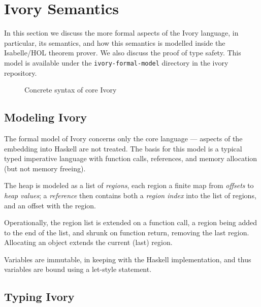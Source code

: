 \section{Ivory Semantics}
\label{sec:semantics}

In this section we discuss the more formal aspects of the Ivory
language, in particular, its semantics, and how this semantics is
modelled inside the Isabelle/HOL theorem prover.  We also
discuss the proof of type safety.  This model is available under the
\texttt{ivory-formal-model} directory in the ivory repository.

\begin{figure}[t]


\label{fig:syntax}
\caption{Concrete syntax of core Ivory }
\end{figure}


\subsection{Modeling Ivory}

The formal model of Ivory concerns only the core language --- aspects
of the embedding into Haskell are not treated.  The basis for this
model is a typical typed imperative language with function calls,
references, and memory allocation (but not memory freeing).  

The heap is modeled as a list of \emph{regions}, each region a finite
map from \emph{offsets} to \emph{heap values}; a \emph{reference} then
contains both a \emph{region index} into the list of regions, and an
offset with the region.  

Operationally, the region list is extended on a function call, a
region being added to the end of the list, and shrunk on function
return, removing the last region.  Allocating an object extends the
current (last) region.

Variables are immutable, in keeping with the Haskell implementation,
and thus variables are bound using a let-style statement.


\subsection{Typing Ivory}

